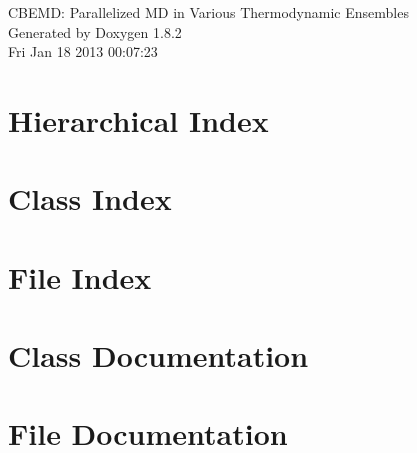 \documentclass{book}
\begin{document}
\hypersetup{pageanchor=false,citecolor=blue}
\begin{titlepage}
\vspace*{7cm}
\begin{center}
{\Large C\-B\-E\-M\-D\-: Parallelized M\-D in Various Thermodynamic Ensembles }\\
\vspace*{1cm}
{\large Generated by Doxygen 1.8.2}\\
\vspace*{0.5cm}
{\small Fri Jan 18 2013 00:07:23}\\
\end{center}
\end{titlepage}
\clearemptydoublepage
{}
\tableofcontents
\clearemptydoublepage
{}
\hypersetup{pageanchor=true,citecolor=blue}
\chapter{Hierarchical Index}

\chapter{Class Index}

\chapter{File Index}

\chapter{Class Documentation}








\chapter{File Documentation}

























\printindex
\end{document}
